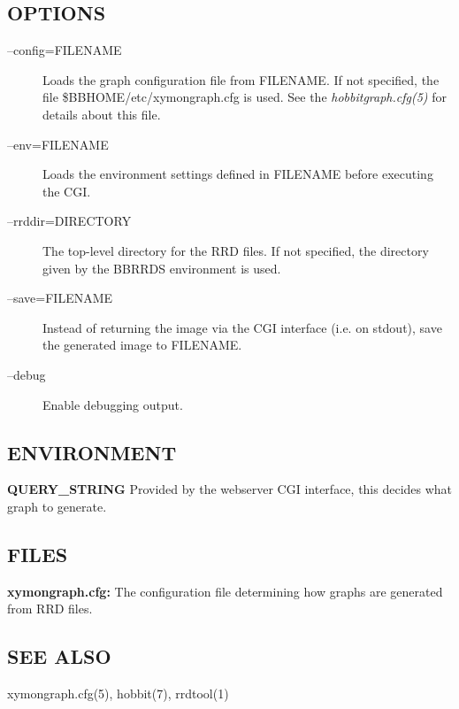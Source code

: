 \subsection{OPTIONS}
\begin{description}
\item[--config=FILENAME] Loads the graph configuration file from FILENAME. If not specified, the file \$BBHOME/etc/xymongraph.cfg is used. See the \emph{hobbitgraph.cfg(5)}
 for details about this file. 

 

\item[--env=FILENAME] Loads the environment settings defined in FILENAME before executing the CGI. 

 

\item[--rrddir=DIRECTORY] The top-level directory for the RRD files. If not specified, the directory given by the BBRRDS environment is used. 

 

\item[--save=FILENAME] Instead of returning the image via the CGI interface (i.e. on stdout), save the generated image to FILENAME. 

 

\item[--debug] Enable debugging output. 

 


\end{description}
\subsection{ENVIRONMENT}


 \textbf{QUERY\_STRING}
 Provided by the webserver CGI interface, this decides what graph to generate. 


 
\subsection{FILES}


 \textbf{xymongraph.cfg:}
 The configuration file determining how graphs are generated from RRD files. 


 
\subsection{SEE ALSO}
xymongraph.cfg(5), hobbit(7), rrdtool(1) 


